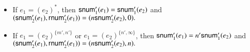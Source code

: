 \begin{itemize}
%
 \item If $e_1 = (e_2)^*$, then ${\sf snum}'_1(e_1) = {\sf snum}'_1(e_2)$ and 
%
  $
  ({\sf snum}'_2(e_1), {\sf rnum}'_2(e_1)) =  (n {\sf snum}'_2(e_2), 0).
  $
 \item If $e_1 = (e_2)^{\{m', n'\}}$ or $e_1 = (e_2)^{\{n', \infty\}}$, then ${\sf snum}'_1(e_1) = n' {\sf snum}'_1(e_2)$ and 
%
  $
  ({\sf snum}'_2(e_1), {\sf rnum}'_2(e_1)) =  (n {\sf snum}'_2(e_2), n).
  $
\end{itemize}


